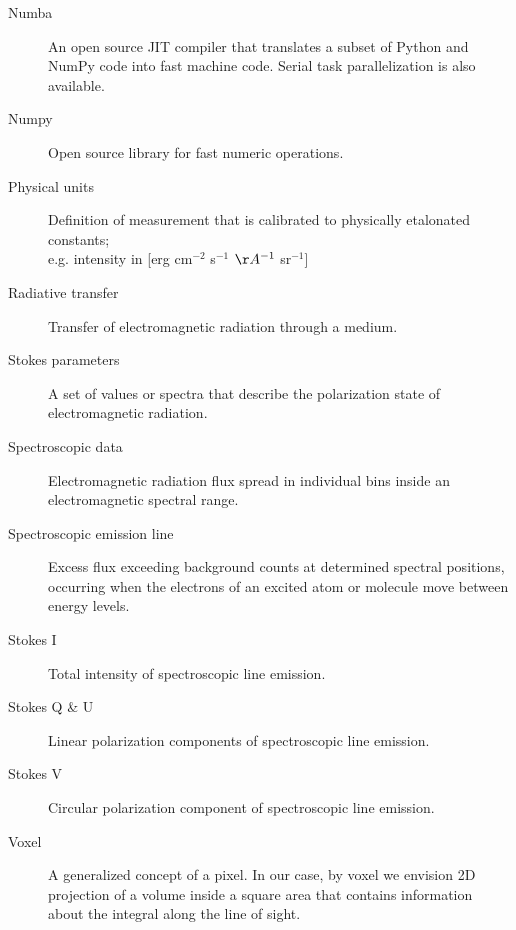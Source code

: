 \documentclass{article}
\begin{document}
\begin{description}
    	\item[Numba]
    	An open source JIT compiler that translates a subset of Python and NumPy code into fast machine code. Serial task parallelization is also available.
    	\item[Numpy]
    Open source library for fast numeric operations.	
    \item[Physical units]
        Definition of measurement that is calibrated to physically etalonated constants;\\ e.g. intensity in [erg cm$^{-2}$ s$^{-1}$ $\AA^{-1}$ sr$^{-1}$]
    \item[Radiative transfer]
        Transfer of electromagnetic radiation through a medium.
    \item[Stokes parameters] 
        A set of values or spectra that describe the polarization state of electromagnetic radiation.       
    \item[Spectroscopic data] 
       Electromagnetic radiation flux spread in individual bins inside an electromagnetic spectral range.
    \item[Spectroscopic emission line]
        Excess flux exceeding background counts at determined spectral positions, occurring when the electrons of an excited atom or molecule move between energy levels.  
    \item[Stokes I]
        Total intensity of spectroscopic line emission.
    \item[Stokes Q \& U]
        Linear polarization components of spectroscopic line emission.
    \item[Stokes V]
        Circular polarization component of spectroscopic line emission.
    \item[Voxel]
        A generalized concept of a pixel. In our case, by voxel we envision 2D projection of a volume inside a square area that contains information about the integral along the line of sight.                     
\end{description}

\vfill

{\scriptsize }
\end{document}

